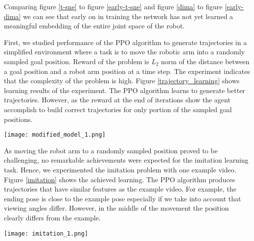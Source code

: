 Comparing figure \ref{t-sne} to figure \ref{early-t-sne} and figure \ref{dima} to figure \ref{early-dima} we can see that early on in training the network has not yet learned a meaningful embedding of the entire joint space of the robot.

First, we studied performance of the PPO algorithm to generate trajectories in a simplified environment where a task is to move the robotic arm into a randomly sampled goal position. Reward of the problem is $L_2$ norm of the distance between a goal position and a robot arm position at a time step. The experiment indicates that the complexity of the problem is high. Figure \ref{trajectory_learning} shows learning results of the experiment. The PPO algorithm learns to generate better trajectories. However, as the reward at the end of iterations show the agent accomplish to build correct trajectories for only portion of the sampled goal positions.

{
    \centering
    \texttt{[image: modified\_model\_1.png]}
    \label{trajectory_learning}
    \vspace{0.25cm}
}

As moving the robot arm to a randomly sampled position proved to be challenging, no remarkable achievements were expected for the imitation learning task. Hence, we experimented the imitation problem with one example video. Figure \ref{imitation} shows the achieved learning. The PPO algorithm produces trajectories that have similar features as the example video. For example, the ending pose is close to the example pose especially if we take into account that viewing angles differ. However, in the middle of the movement the position clearly differs from the example.

{
    \centering
    \texttt{[image: imitation\_1.png]}
    \label{imitation}
    \vspace{0.25cm}
}